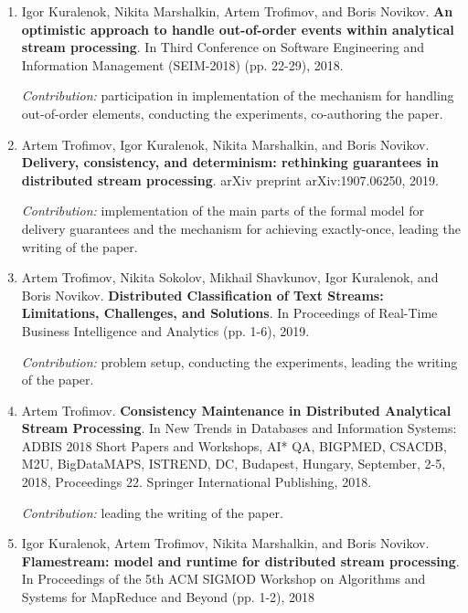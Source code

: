 \begin{enumerate}
    \item Igor Kuralenok, Nikita Marshalkin, Artem Trofimov, and Boris Novikov. \textbf{An optimistic approach to handle out-of-order events within analytical stream processing}. In Third Conference on Software Engineering and Information Management (SEIM-2018) (pp. 22-29), 2018. \newline
    
    \textit{Contribution:} participation in implementation of the mechanism for handling out-of-order elements, conducting the experiments, co-authoring the paper.

    \item Artem Trofimov, Igor Kuralenok, Nikita Marshalkin, and Boris Novikov. \textbf{Delivery, consistency, and determinism: rethinking guarantees in distributed stream processing}. arXiv preprint arXiv:1907.06250, 2019. \newline
    
    \textit{Contribution:} implementation of the main parts of the formal model for delivery guarantees and the mechanism for achieving exactly-once, leading the writing of the paper.

    \item Artem Trofimov, Nikita Sokolov, Mikhail Shavkunov, Igor Kuralenok, and Boris Novikov. \textbf{Distributed Classification of Text Streams: Limitations, Challenges, and Solutions}. In Proceedings of Real-Time Business Intelligence and Analytics (pp. 1-6), 2019. \newline
    
    \textit{Contribution:} problem setup, conducting the experiments, leading the writing of the paper.

    \item Artem Trofimov. \textbf{Consistency Maintenance in Distributed Analytical Stream Processing}. In New Trends in Databases and Information Systems: ADBIS 2018 Short Papers and Workshops, AI* QA, BIGPMED, CSACDB, M2U, BigDataMAPS, ISTREND, DC, Budapest, Hungary, September, 2-5, 2018, Proceedings 22. Springer International Publishing, 2018. \newline
    
    \textit{Contribution:} leading the writing of the paper.

    \item Igor Kuralenok, Artem Trofimov, Nikita Marshalkin, and Boris Novikov. \textbf{Flamestream: model and runtime for distributed stream processing}. In Proceedings of the 5th ACM SIGMOD Workshop on Algorithms and Systems for MapReduce and Beyond (pp. 1-2), 2018 \newline
    

\end{enumerate}

